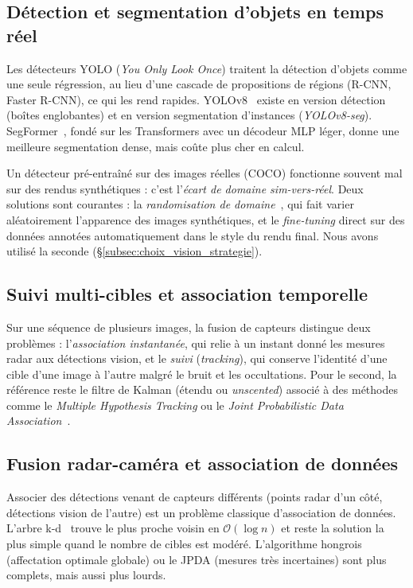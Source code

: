 \documentclass[12pt,a4paper,titlepage]{article}
\begin{document}
\subsection{Détection et segmentation d'objets en temps réel}
\label{subsec:art_detection}

Les détecteurs YOLO (\textit{You Only Look Once}) traitent la détection d'objets comme une seule régression, au lieu d'une cascade de propositions de régions (R-CNN, Faster R-CNN), ce qui les rend rapides. YOLOv8~\cite{ultralytics_yolov8} existe en version détection (boîtes englobantes) et en version segmentation d'instances (\textit{YOLOv8-seg}). SegFormer~\cite{segformer}, fondé sur les Transformers avec un décodeur MLP léger, donne une meilleure segmentation dense, mais coûte plus cher en calcul.

Un détecteur pré-entraîné sur des images réelles (COCO) fonctionne souvent mal sur des rendus synthétiques : c'est l'\textit{écart de domaine sim-vers-réel}. Deux solutions sont courantes : la \textit{randomisation de domaine}~\cite{domain_randomization}, qui fait varier aléatoirement l'apparence des images synthétiques, et le \textit{fine-tuning} direct sur des données annotées automatiquement dans le style du rendu final. Nous avons utilisé la seconde (\S\ref{subsec:choix_vision_strategie}).

\subsection{Suivi multi-cibles et association temporelle}
\label{subsec:art_tracking}

Sur une séquence de plusieurs images, la fusion de capteurs distingue deux problèmes : l'\textit{association instantanée}, qui relie à un instant donné les mesures radar aux détections vision, et le \textit{suivi} (\textit{tracking}), qui conserve l'identité d'une cible d'une image à l'autre malgré le bruit et les occultations. Pour le second, la référence reste le filtre de Kalman (étendu ou \textit{unscented}) associé à des méthodes comme le \textit{Multiple Hypothesis Tracking} ou le \textit{Joint Probabilistic Data Association}~\cite{bar_shalom_tracking}.

\subsection{Fusion radar-caméra et association de données}
\label{subsec:art_fusion}

Associer des détections venant de capteurs différents (points radar d'un côté, détections vision de l'autre) est un problème classique d'association de données. L'arbre k-d~\cite{bentley_kdtree} trouve le plus proche voisin en $\mathcal{O}(\log n)$ et reste la solution la plus simple quand le nombre de cibles est modéré. L'algorithme hongrois (affectation optimale globale) ou le JPDA (mesures très incertaines) sont plus complets, mais aussi plus lourds.
\end{document}
